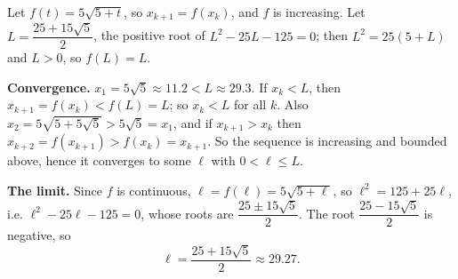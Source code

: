 Let $f(t)=5\sqrt{5+t}$, so $x_{k+1}=f(x_k)$, and $f$ is increasing. Let $L=\dfrac{25+15\sqrt5}{2}$, the positive root of $L^2-25L-125=0$; then $L^2=25(5+L)$ and $L>0$, so $f(L)=L$.

\textbf{Convergence.} $x_1=5\sqrt5\approx11.2<L\approx29.3$. If $x_k<L$, then $x_{k+1}=f(x_k)<f(L)=L$; so $x_k<L$ for all $k$. Also $x_2=5\sqrt{5+5\sqrt5}>5\sqrt5=x_1$, and if $x_{k+1}>x_k$ then $x_{k+2}=f(x_{k+1})>f(x_k)=x_{k+1}$. So the sequence is increasing and bounded above, hence it converges to some $\ell$ with $0<\ell\le L$.

\textbf{The limit.} Since $f$ is continuous, $\ell=f(\ell)=5\sqrt{5+\ell}$, so $\ell^2=125+25\ell$, i.e. $\ell^2-25\ell-125=0$, whose roots are $\dfrac{25\pm15\sqrt5}{2}$. The root $\dfrac{25-15\sqrt5}{2}$ is negative, so
\[\ell=\boxed{\dfrac{25+15\sqrt5}{2}}\approx29.27.\]
